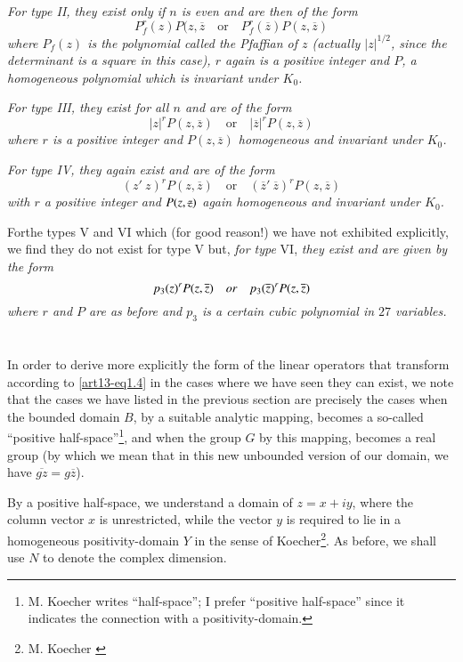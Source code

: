 {\em For type II, they exist only if $n$ is even and are then of the form}
$$
P^{r}_{f}(z)P(z,\overline{z}\quad\text{or}\quad P^{r}_{f}(\overline{z})P(z,\overline{z})
$$
{\em where $P_{f}(z)$ is the polynomial called the Pfaffian of $z$ (actually $|z|^{1/2}$, since the determinant is a square in this case), $r$ again is a positive integer and $P$, a homogeneous polynomial which is invariant under $K_{0}$.}

{\em For type III, they exist for all $n$ and are of the form}
$$
|z|^{r}P(z,\overline{z})\quad\text{or}\quad |\overline{z}|^{r}P(z,\overline{z})
$$
{\em where $r$ is a positive integer and $P(z,\overline{z})$ homogeneous and invariant under $K_{0}$.}

{\em For type IV, they again exist and are of the form}
$$
(z' \ z)^{r}P(z,\overline{z})\quad\text{or}\quad (\overline{z}' \ \overline{z})^{r}P(z,\overline{z})
$$
{\em with $r$ a positive integer and $P(z,\text{\st{$z$}})$ again homogeneous and invariant under $K_{0}$.}

For\pageoriginale the types V and VI which (for good reason!) we have not exhibited explicitly, we find they do not exist for type V but, {\em for type} VI, {\em they exist and are given by the form}
$$
p_{3}(z)^{r}P(z,\overline{z})\quad\text{\em or}\quad p_{3}(\overline{z})^{r}P(z,\overline{z})
$$
{\em where $r$ and $P$ are as before and $p_{3}$ is a certain cubic polynomial in $27$ variables.}

\section{}\label{art13-sec3}
In order to derive more explicitly the form of the linear operators that transform according to \eqref{art13-eq1.4} in the cases where we have seen they can exist, we note that the cases we have listed in the previous section are precisely the cases when the bounded domain $B$, by a suitable analytic mapping, becomes a so-called ``positive half-space''\footnote{M. Koecher \cite{art13-key2} writes ``half-space''; I prefer ``positive half-space'' since it indicates the connection with a positivity-domain.}, and when the group $G$ by this mapping, becomes a real group (by which we mean that in this new unbounded version of our domain, we have $\overline{gz}=g\overline{z}$).

By a positive half-space, we understand a domain of $z=x+iy$, where the column vector $x$ is unrestricted, while the vector $y$ is required to lie in a homogeneous positivity-domain $Y$ in the sense of Koecher\footnote{M. Koecher \cite{art13-key1}}. As before, we shall use $N$ to denote the complex dimension.

